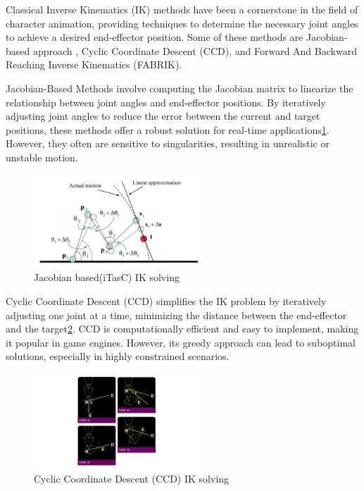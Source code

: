 \documentclass[../../main.tex]{subfiles}
\begin{document}
Classical Inverse Kinematics (IK) methods have been a cornerstone in the field of character animation, providing techniques to determine the necessary joint angles to achieve a desired end-effector position. Some of these methods are Jacobian-based approach \cite{4648032}, Cyclic Coordinate Descent (CCD)\cite{kenwright2012inverse}, and Forward And Backward Reaching Inverse Kinematics (FABRIK)\cite{aristidou2011fabrik}.

Jacobian-Based Methods involve computing the Jacobian matrix to linearize the relationship between joint angles and end-effector positions. By iteratively adjusting joint angles to reduce the error between the current and target positions, these methods offer a robust solution for real-time applications\ref{fig:jacobian_based}. However, they often are sensitive to singularities, resulting in unrealistic or unstable motion.

\begin{figure}
    \centering \includegraphics[width = 2.5in]{chapters/motion_matching/images/jacobian_based.png}
    \caption{Jacobian based(iTasC) IK solving}
    \label{fig:jacobian_based}
\end{figure}

Cyclic Coordinate Descent (CCD) simplifies the IK problem by iteratively adjusting one joint at a time, minimizing the distance between the end-effector and the target\ref{fig:ccdik}. CCD is computationally efficient and easy to implement, making it popular in game engines. However, its greedy approach can lead to suboptimal solutions, especially in highly constrained scenarios.

\begin{figure}
  \centering \includegraphics[width = 2.5in]{chapters/motion_matching/images/ccdik.png}
  \caption{Cyclic Coordinate Descent (CCD) IK solving}
  \label{fig:ccdik}
\end{figure}
\end{document}
